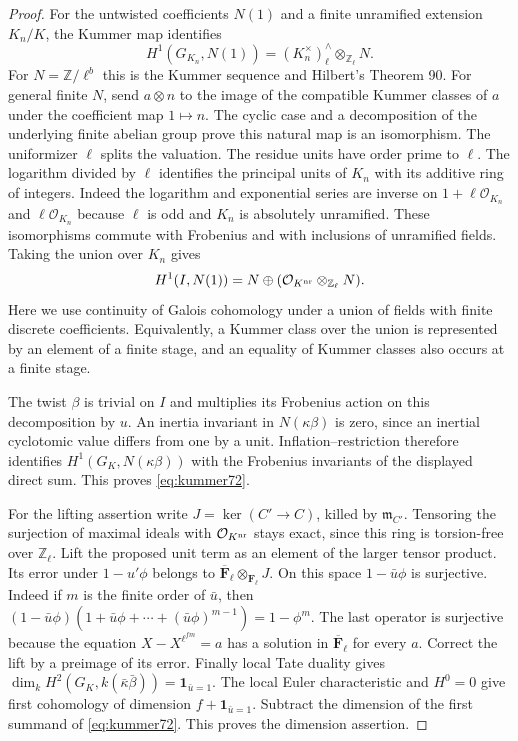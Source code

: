 \documentclass[a4paper,11pt]{article}
\theoremstyle{definition}
\theoremstyle{remark}
\newcommand{\ZZ}{\mathbb Z}\newcommand{\ord}{\operatorname{ord}}
\numberwithin{equation}{section}
\begin{document}
\begin{proof}
For the untwisted coefficients \(N(1)\) and a finite unramified
extension \(K_n/K\), the Kummer map identifies
\[
 H^1(G_{K_n},N(1))
       = (K_n^\times)^{\wedge}_{\ell}\otimes_{\ZZ_\ell}N .
\]
For \(N=\ZZ/\ell^b\) this is the Kummer sequence and Hilbert's
Theorem 90. For general finite \(N\), send \(a\otimes n\)
to the image of the compatible Kummer classes of \(a\) under
the coefficient map \(1\mapsto n\). The cyclic case and a
decomposition of the underlying finite abelian group prove this
natural map is an isomorphism. The uniformizer \(\ell\) splits
the valuation. The residue units have order prime to \(\ell\).
The logarithm divided by \(\ell\) identifies the principal units
of \(K_n\) with its additive ring of integers. Indeed the logarithm
and exponential series are inverse on \(1+\ell\mathcal O_{K_n}\)
and \(\ell\mathcal O_{K_n}\) because \(\ell\) is odd and
\(K_n\) is absolutely unramified. These isomorphisms commute
with Frobenius and with inclusions of unramified fields. Taking
the union over \(K_n\) gives
\[
 H^1(I,N(1))=N\oplus
       (\mathcal O_{K^{\rm nr}}\otimes_{\ZZ_\ell}N).
\]
Here we use continuity of Galois cohomology under a union of
fields with finite discrete coefficients. Equivalently, a
Kummer class over the union is represented by an element of a
finite stage, and an equality of Kummer classes also occurs
at a finite stage.

The twist \(\beta\) is trivial on \(I\) and multiplies its
Frobenius action on this decomposition by \(u\).
An inertia invariant in \(N(\kappa\beta)\) is zero, since
an inertial cyclotomic value differs from one by a unit. Inflation--restriction
therefore identifies \(H^1(G_K,N(\kappa\beta))\) with the
Frobenius invariants of the displayed direct sum. This proves
\eqref{eq:kummer72}.

For the lifting assertion write \(J=\ker(C'\to C)\), killed by
\(\mathfrak m_{C'}\). Tensoring the surjection of maximal ideals
with \(\mathcal O_{K^{\rm nr}}\) stays exact, since this ring
is torsion-free over \(\ZZ_\ell\). Lift the proposed unit term
as an element of the larger tensor product. Its error under
\(1-u'\phi\) belongs to
\(\overline{\mathbf F}_\ell\otimes_{\mathbf F_\ell}J\).
On this space \(1-\bar u\phi\) is surjective. Indeed if
\(m\) is the finite order of \(\bar u\), then
\((1-\bar u\phi)(1+\bar u\phi+\cdots+(\bar u\phi)^{m-1})
=1-\phi^m\). The last operator is surjective because the
equation \(X-X^{\ell^{fm}}=a\) has a solution in
\(\overline{\mathbf F}_\ell\) for every \(a\). Correct the
lift by a preimage of its error. Finally local Tate duality
gives \(\dim_k H^2(G_K,k(\bar\kappa\bar\beta))
=\mathbf1_{\bar u=1}\). The local Euler characteristic and
\(H^0=0\) give first cohomology of dimension
\(f+\mathbf1_{\bar u=1}\). Subtract the dimension of the
first summand of \eqref{eq:kummer72}. This proves the dimension
assertion.
\end{proof}
\end{document}

